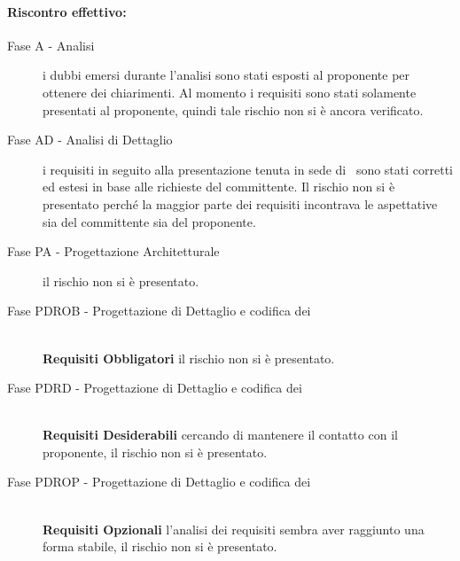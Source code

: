 \documentclass[../PianoProgetto.tex]{subfiles}
\begin{document}
	\paragraph*{Riscontro effettivo:}
		\begin{description}
			\item[Fase A - Analisi] i dubbi emersi durante l'analisi sono stati esposti al proponente per ottenere dei chiarimenti. Al momento i requisiti sono stati solamente presentati al proponente, quindi tale rischio non si è ancora verificato.
			\item[Fase AD - Analisi di Dettaglio]  i requisiti in seguito alla presentazione tenuta in sede di \revisionedeirequisiti\ sono stati corretti ed estesi in base alle richieste del committente. Il rischio non si è presentato perché la maggior parte dei requisiti incontrava le aspettative sia del committente sia del proponente. 
			\item[Fase PA - Progettazione Architetturale] il rischio non si è presentato.
			\item[Fase PDROB - Progettazione di Dettaglio e codifica dei]  \ \\
					\textbf{Requisiti Obbligatori} il rischio non si è presentato.
			\item[Fase PDRD - Progettazione di Dettaglio e codifica dei] \ \\
					\textbf{Requisiti Desiderabili} cercando di mantenere il contatto con il proponente, il rischio non si è presentato.
			\item[Fase PDROP - Progettazione di Dettaglio e codifica dei]  \ \\
					\textbf{Requisiti Opzionali} l'analisi dei requisiti sembra aver raggiunto una forma stabile, il rischio non si è presentato.
		\end{description}

			
\end{document}
